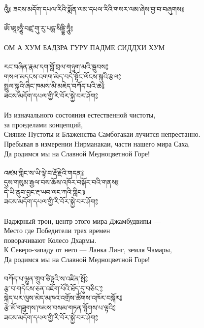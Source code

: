 
\newpage
\ru
{}\\

{\ti འུྃ༔ ཟངས་མདོག་དཔལ་རིའི་སྨོན་ལམ་དཔལ་རིའི་གསར་ལམ་ཞེས་བྱ་བ་བཞུགས༔}\\
\\
{\ti ཨོཾ་ཨཱཿཧཱུྃ་བཛྲ་གུ་རུ་པདྨ་སིདྡྷི་ཧཱུྃ༔}\\
\\
ОМ А ХУМ БАДЗРА ГУРУ ПАДМЕ СИДДХИ ХУМ\\
\\
{\ti རང་བཞིན་རྣམ་དག་བློ་བྲལ་གཉུག་མའི་སྦུབས༔\\
གསལ་མདངས་འགག་མེད་བདེ་སྟོང་ལོངས་སྐུའི་རྩལ༔\\
སྤྲུལ་སྐུའི་ཞིང་ཁམས་མི་མཇེད་བཀོད་པའི་ཆ༔\\
ཟངས་མདོག་དཔལ་གྱི་རི་བོར་སྐྱེ་བར་ཤོག༔}\\
\\
Из изначального состояния естественной чистоты, \\ \indent за проеделами концепций,\\
Сияние Пустоты и Блаженства Самбогакаи лучится непрестанно.\\
Пребывая в измерении Нирманакаи, части нашего мира Саха,\\
Да родимся мы на Славной Медноцветной Горе!\\
\\
{\ti འཛམ་གླིང་ས་ཡི་ལྟེ་བ་རྡོ་རྗེའི་གདན༔\\
དུས་གསུམ་རྒྱལ་བས་ཆོས་འཁོར་བསྐོར་བའི་གནས༔\\
དེ་ཡི་ནུབ་བྱང་རྔ་ཡབ་ལང་ཀའི་གླིང་༔\\
ཟངས་མདོག་དཔལ་གྱི་རི་བོར་སྐྱེ་བར་ཤོག༔}\\
\\
Ваджрный трон, центр этого мира Джамбудвипы —\\
Место где Победители трех времен \\ \indent поворачивают Колесо Дхармы.\\
К Северо-западу от него — Ланка Линг, земля Чамары,\\
Да родимся мы на Славной Медноцветной Горе!\\
\\
\newpage
{\ti བཀོད་པ་ལྷུན་གྲུབ་ཙིཏྟའི་ས་འཛིན་སྤོ༔\\
རྩ་བ་གདེངས་ཅན་འཇོག་པོའི་ཐོད་དུ་བཅིང་༔\\
སྐེད་པར་ལུས་མེད་མཁའ་འགྲོས་ཚོགས་འཁོར་བསྐོར༔\\
རྩེ་མོ་གཟུགས་ཁམས་བསམ་གཏན་སྙོགས་པ་ལྟའི༔\\
ཟངས་མདོག་དཔལ་གྱི་རི་བོར་སྐྱེ་བར་ཤོག༔}\\

